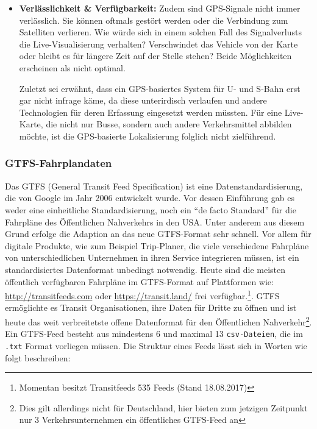 \begin{itemize}[label={}]
      \item \textbf{Verlässlichkeit \& Verfügbarkeit:} 
        Zudem sind GPS-Signale nicht immer verlässlich. Sie können oftmals gestört werden oder die Verbindung zum Satelliten verlieren. Wie würde sich in einem solchen Fall des Signalverlusts die Live-Visualisierung verhalten? Verschwindet das Vehicle von der Karte oder bleibt es für längere Zeit auf der Stelle stehen? Beide Möglichkeiten erscheinen als nicht optimal. 

        Zuletzt sei erwähnt, dass ein GPS-basiertes System für U- und S-Bahn erst gar nicht infrage käme, da diese unterirdisch verlaufen und andere Technologien für deren Erfassung eingesetzt werden müssten. Für eine Live-Karte, die nicht nur Busse, sondern auch andere Verkehrsmittel abbilden möchte, ist die GPS-basierte Lokalisierung folglich nicht zielführend. 
    \end{itemize} 


    \subsubsection{GTFS-Fahrplandaten}
    \label{ssub:gtfs_fahrplandaten}
      Das GTFS (General Transit Feed Specification) ist eine Datenstandardisierung, die von Google im Jahr 2006 entwickelt wurde. Vor dessen Einführung gab es weder eine einheitliche Standardisierung, noch ein "`de facto Standard"' für die Fahrpläne des Öffentlichen Nahverkehrs in den USA. Unter anderem aus diesem Grund erfolge die Adaption an das neue GTFS-Format sehr schnell. Vor allem für digitale Produkte, wie zum Beispiel Trip-Planer, die viele verschiedene Fahrpläne von unterschiedlichen Unternehmen in ihren Service integrieren müssen, ist ein standardisiertes Datenformat unbedingt notwendig. Heute sind die meisten öffentlich verfügbaren Fahrpläne im GTFS-Format auf Plattformen wie: \url{http://transitfeeds.com} oder \url{https://transit.land/} frei verfügbar.\footnote{Momentan besitzt Transitfeeds 535 Feeds (Stand 18.08.2017)}. GTFS ermöglichte es Transit Organisationen, ihre Daten für Dritte zu öffnen und ist heute das weit verbreitetste offene Datenformat für den Öffentlichen Nahverkehr\footnote{Dies gilt allerdings nicht für Deutschland, hier bieten zum jetzigen Zeitpunkt nur 3 Verkehrsunternehmen ein öffentliches GTFS-Feed an}.\parencite[S. 2]{roush}\\

      Ein GTFS-Feed besteht aus mindestens 6 und maximal 13 \texttt{csv-Dateien}, die im \texttt{.txt} Format vorliegen müssen. Die Struktur eines Feeds lässt sich in Worten wie folgt beschreiben:

